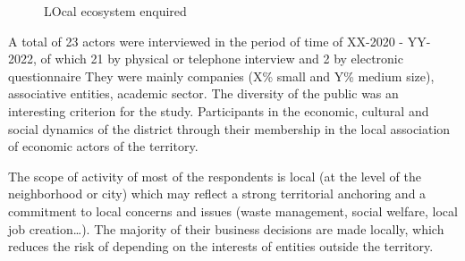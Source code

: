 \documentclass[
  11pt,
]{article}
\begin{document}
\begin{figure}
\begin{minipage}[t]{0.50\linewidth}
{{}

}

\end{minipage}%

\caption{\label{fig-ecosystem}LOcal ecosystem enquired}

\end{figure}

A total of 23 actors were interviewed in the period of time of XX-2020 -
YY-2022, of which 21 by physical or telephone interview and 2 by
electronic questionnaire They were mainly companies (X\% small and Y\%
medium size), associative entities, academic sector. The diversity of
the public was an interesting criterion for the study. Participants in
the economic, cultural and social dynamics of the district through their
membership in the local association of economic actors of the territory.

The scope of activity of most of the respondents is local (at the level
of the neighborhood or city) which may reflect a strong territorial
anchoring and a commitment to local concerns and issues (waste
management, social welfare, local job creation\ldots). The majority of
their business decisions are made locally, which reduces the risk of
depending on the interests of entities outside the territory.
\end{document}
